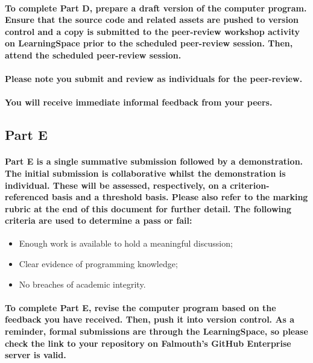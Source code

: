 \documentclass{../../fal_assignment}
\begin{document}
\paragraph{To complete Part D, prepare a draft version of the computer program. Ensure that the source code and related assets are pushed to version control and a copy is submitted to the peer-review workshop activity on LearningSpace prior to the scheduled peer-review session. Then, attend the scheduled peer-review session.}

\paragraph{Please note you submit and review as individuals for the peer-review.}

\paragraph{You will receive immediate \textbf{informal feedback} from your \textbf{peers}.}

\subsection*{Part E}

\paragraph{Part E is a \textbf{single summative submission} followed by a \textbf{demonstration}. The initial submission is \textbf{collaborative} whilst the demonstration is \textbf{individual}. These will be assessed, respectively, on a \textbf{criterion-referenced} basis and a \textbf{threshold} basis. Please also refer to the marking rubric at the end of this document for further detail. The following criteria are used to determine a pass or fail:}

\begin{itemize}
	\item Enough work is available to hold a meaningful discussion;
	\item Clear evidence of programming knowledge;
	\item No breaches of academic integrity.
\end{itemize}

\paragraph{To complete Part E, revise the computer program based on the feedback you have received. Then, push it into version control. As a reminder, formal submissions are through the LearningSpace, so please check the link to your repository on Falmouth's GitHub Enterprise server is valid.}
\end{document}

